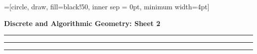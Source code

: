 \documentclass[a4paper, 10pt]{article}
\theoremstyle{definition} %
\begin{document}
\onehalfspacing
{}=[circle, draw, fill=black!50, inner sep = 0pt, minimum width=4pt]

\textbf{\Large Discrete and Algorithmic Geometry: Sheet 2}

\vspace{20pt}



\vspace{5pt}

\begin{center}
    \rule{5cm}{0.4pt}
\end{center}

\newpage



\vspace{5pt}

\begin{center}
    \rule{5cm}{0.4pt}
\end{center}

\newpage



\vspace{5pt}

\begin{center}
    \rule{5cm}{0.4pt}
\end{center}
\end{document}
